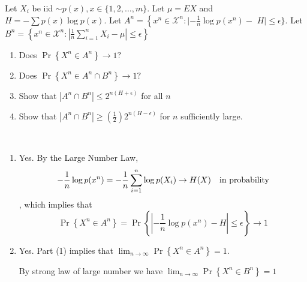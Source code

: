 \begin{exercise}[AEP]{ Let $X_{i}$ be iid $\sim p(x), x \in\{1,2, \ldots, m\} .$ Let $\mu=E X$ and $H=-\sum p(x) \log p(x) .$ Let $A^{n}=\left\{x^{n} \in \mathcal{X}^{n}: |-\frac{1}{n} \log p\left(x^{n}\right)-\right.$
  $H | \leq \epsilon\} .$ Let $B^{n}=\left\{x^{n} \in \mathcal{X}^{n}:\left|\frac{1}{n} \sum_{i=1}^{n} X_{i}-\mu\right| \leq \epsilon\right\}$
  \begin{enumerate}
    \item Does $\operatorname{Pr}\left\{X^{n} \in A^{n}\right\} \longrightarrow 1 ?$
    \item Does $\operatorname{Pr}\left\{X^{n} \in A^{n} \cap B^{n}\right\} \longrightarrow 1 ?$
    \item Show that $\left|A^{n} \cap B^{n}\right| \leq 2^{n(H+\epsilon)}$ for all $n$
    \item Show that $\left|A^{n} \cap B^{n}\right| \geq\left(\frac{1}{2}\right) 2^{n(H-\epsilon)}$ for $n$ sufficiently large.
  \end{enumerate}}
  \begin{solution}
  \par{~}
  \begin{enumerate}
    \item {
      Yes. By the Large Number Law,
      \begin{equation}
        - \frac{1}{n}\log p(x^n) = - \frac{1}{n} \sum_{i=1}^{n} \log p(X_i) \rightarrow H(X) \text{\quad in probability}
      \end{equation}
      , which implies that
      \begin{equation}
        \Pr \left\{X^n \in A^n \right\} = \Pr \left\{ | -\frac{1}{n} \log p\left(x^{n}\right)-H | \leq \epsilon \right\} \rightarrow 1
      \end{equation}
      }
    \item {
      Yes. Part (1) implies that $\lim_{n\rightarrow\infty} \Pr \left\{X^n \in A^n \right\} = 1$.

      By strong law of large number we have $\lim_{n\rightarrow\infty} \Pr \left\{X^n \in B^n \right\} = 1$

}
\end{enumerate}
\end{solution}
\end{exercise}
